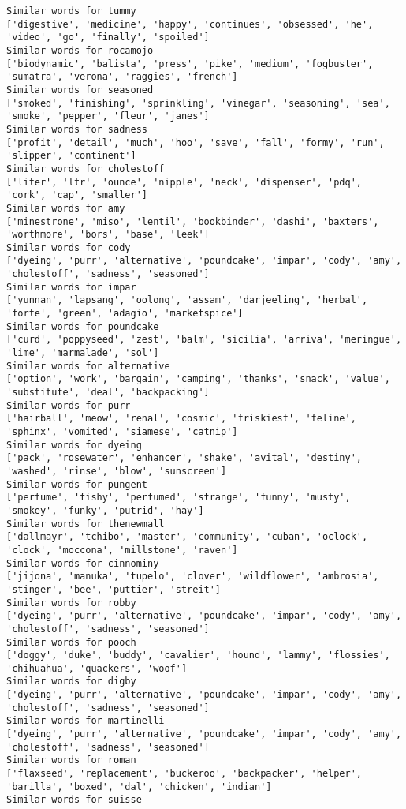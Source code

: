 \documentclass[11pt]{article}
\begin{document}
\begin{Verbatim}[commandchars=\\\{\}]
Similar words for tummy
['digestive', 'medicine', 'happy', 'continues', 'obsessed', 'he', 'video', 'go', 'finally', 'spoiled']
Similar words for rocamojo
['biodynamic', 'balista', 'press', 'pike', 'medium', 'fogbuster', 'sumatra', 'verona', 'raggies', 'french']
Similar words for seasoned
['smoked', 'finishing', 'sprinkling', 'vinegar', 'seasoning', 'sea', 'smoke', 'pepper', 'fleur', 'janes']
Similar words for sadness
['profit', 'detail', 'much', 'hoo', 'save', 'fall', 'formy', 'run', 'slipper', 'continent']
Similar words for cholestoff
['liter', 'ltr', 'ounce', 'nipple', 'neck', 'dispenser', 'pdq', 'cork', 'cap', 'smaller']
Similar words for amy
['minestrone', 'miso', 'lentil', 'bookbinder', 'dashi', 'baxters', 'worthmore', 'bors', 'base', 'leek']
Similar words for cody
['dyeing', 'purr', 'alternative', 'poundcake', 'impar', 'cody', 'amy', 'cholestoff', 'sadness', 'seasoned']
Similar words for impar
['yunnan', 'lapsang', 'oolong', 'assam', 'darjeeling', 'herbal', 'forte', 'green', 'adagio', 'marketspice']
Similar words for poundcake
['curd', 'poppyseed', 'zest', 'balm', 'sicilia', 'arriva', 'meringue', 'lime', 'marmalade', 'sol']
Similar words for alternative
['option', 'work', 'bargain', 'camping', 'thanks', 'snack', 'value', 'substitute', 'deal', 'backpacking']
Similar words for purr
['hairball', 'meow', 'renal', 'cosmic', 'friskiest', 'feline', 'sphinx', 'vomited', 'siamese', 'catnip']
Similar words for dyeing
['pack', 'rosewater', 'enhancer', 'shake', 'avital', 'destiny', 'washed', 'rinse', 'blow', 'sunscreen']
Similar words for pungent
['perfume', 'fishy', 'perfumed', 'strange', 'funny', 'musty', 'smokey', 'funky', 'putrid', 'hay']
Similar words for thenewmall
['dallmayr', 'tchibo', 'master', 'community', 'cuban', 'oclock', 'clock', 'moccona', 'millstone', 'raven']
Similar words for cinnominy
['jijona', 'manuka', 'tupelo', 'clover', 'wildflower', 'ambrosia', 'stinger', 'bee', 'puttier', 'streit']
Similar words for robby
['dyeing', 'purr', 'alternative', 'poundcake', 'impar', 'cody', 'amy', 'cholestoff', 'sadness', 'seasoned']
Similar words for pooch
['doggy', 'duke', 'buddy', 'cavalier', 'hound', 'lammy', 'flossies', 'chihuahua', 'quackers', 'woof']
Similar words for digby
['dyeing', 'purr', 'alternative', 'poundcake', 'impar', 'cody', 'amy', 'cholestoff', 'sadness', 'seasoned']
Similar words for martinelli
['dyeing', 'purr', 'alternative', 'poundcake', 'impar', 'cody', 'amy', 'cholestoff', 'sadness', 'seasoned']
Similar words for roman
['flaxseed', 'replacement', 'buckeroo', 'backpacker', 'helper', 'barilla', 'boxed', 'dal', 'chicken', 'indian']
Similar words for suisse

\end{Verbatim}
\end{document}

